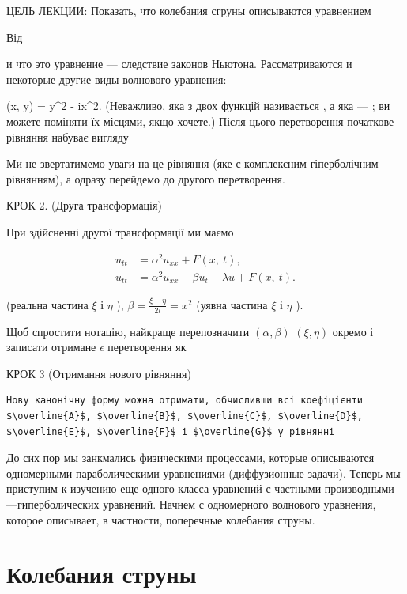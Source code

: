 \documentclass[
  ukrainian,
]{article}
\begin{document}
ЦЕЛЬ ЛЕКЦИИ: Показать, что колебания сгруны описываются уравнением

Від

и что это уравнение --- следствие законов Ньютона. Рассматриваются и
некоторые другие виды волнового уравнения:

\eta(x, y) = y\^{}2 - ix\^{}2. (Неважливо, яка з двох функцій
називається \xi , а яка --- \eta ; ви можете поміняти їх місцями, якщо
хочете.) Після цього перетворення початкове рівняння набуває вигляду

Ми не звертатимемо уваги на це рівняння (яке є комплексним гіперболічним
рівнянням), а одразу перейдемо до другого перетворення.

КРОК 2. (Друга трансформація)

При здійсненні другої трансформації ми маємо

\[
\begin{split} u_{tt} &= \alpha^2 u_{xx} + F\left(x, \ t\right), \\ u_{tt} &= \alpha^2 u_{xx} - \beta u_t - \lambda u + F\left(x, \ t\right). \end{split}
\]

(реальна частина \(\xi\) і \(\eta\) ),
\(\beta = \frac{\xi - \eta}{2\iota} = x^2\) (уявна частина \(\xi\) і
\(\eta\) ).

Щоб спростити нотацію, найкраще перепозначити \((\alpha,\beta)\)
\((\xi,\eta)\) окремо і записати отримане \(\epsilon\) перетворення як

КРОК 3 (Отримання нового рівняння)

\begin{verbatim}
Нову канонічну форму можна отримати, обчисливши всі коефіцієнти $\overline{A}$, $\overline{B}$, $\overline{C}$, $\overline{D}$, $\overline{E}$, $\overline{F}$ і $\overline{G}$ у рівнянні
\end{verbatim}

До сих пор мы занкмались физическими процессами, которые описываются
одномерными параболическими уравнениями (диффузионные задачи). Теперь мы
приступим к изучению еще одного класса уравнений с частными
производными---гиперболических уравнений. Начнем с одномерного волнового
уравнения, которое описывает, в частности, поперечные колебания струны.

\section{Колебания
струны}\label{ux43aux43eux43bux435ux431ux430ux43dux438ux44f-ux441ux442ux440ux443ux43dux44b}
\end{document}
